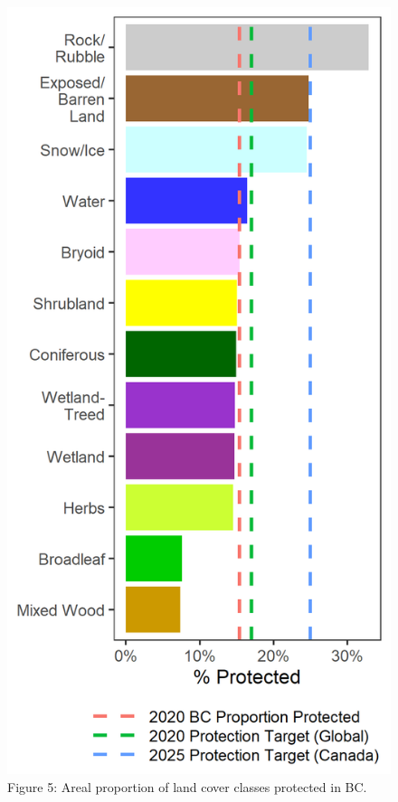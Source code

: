 \documentclass[10pt,oneside]{article}
\makeatletter
\def\maxwidth{\ifdim\Gin@nat@width>\linewidth\linewidth
\else\Gin@nat@width\fi}
\let\Oldincludegraphics\includegraphics
\renewcommand{\includegraphics}[1]{\Oldincludegraphics[width=\maxwidth]{#1}}
\makeatother
\begin{document}
\begin{figure}
\hypertarget{fig:vlce-conch}{%
\centering
\includegraphics{figures/vlce_bar.png}
\caption{Figure 5: Areal proportion of land cover classes protected in
BC.}\label{fig:vlce-conch}
}
\end{figure}
\end{document}
